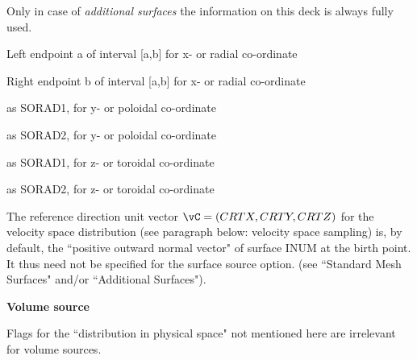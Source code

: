 Only in case of \emph{additional surfaces} the information on this
deck is always fully used.
\begin{list}{ } {}
\item[{\bf SORAD1 }]
Left endpoint a of interval [a,b] for
x- or radial co-ordinate
\item[{\bf SORAD2 }]
Right endpoint b of interval [a,b] for
x- or radial co-ordinate
\item[{\bf SORAD3 }]
as SORAD1, for y- or poloidal co-ordinate
\item[{\bf SORAD4 }]
as SORAD2, for y- or poloidal co-ordinate
\item[{\bf SORAD5 }]
as SORAD1, for z- or toroidal co-ordinate
\item[{\bf SORAD6 }]
as SORAD2, for z- or toroidal co-ordinate
\end{list}

The reference direction unit vector $\vC = (CRTX,CRTY,CRTZ)$
for the velocity space distribution
(see paragraph below: velocity space sampling)
is, by default, the ``positive outward normal vector" of
surface INUM
at the birth point. It thus need not be specified for the
surface source option. (see ``Standard Mesh Surfaces" and/or
``Additional Surfaces").

\medskip

\textcolor[rgb]{0.00,0.00,1.00}{{\bf Volume source }}

Flags for the ``distribution in physical space" not mentioned here are
irrelevant for volume sources.

